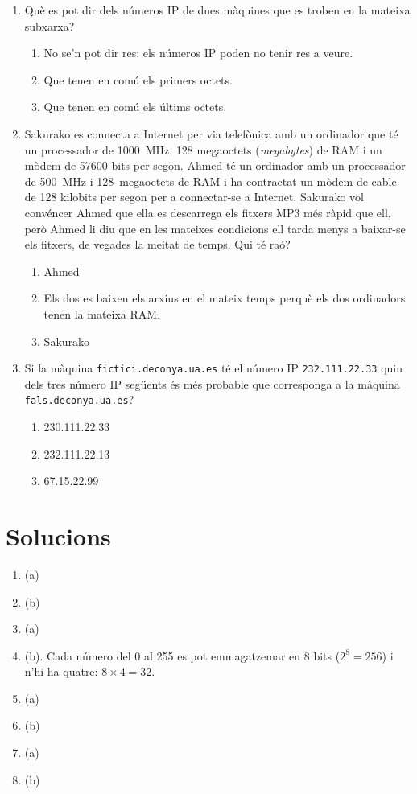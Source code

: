 \begin{enumerate}
\item 
   Què es pot dir dels números IP de dues màquines que es 
   troben en la mateixa subxarxa?
   
\begin{enumerate}
\item No se'n pot dir res: els números IP poden no tenir res a veure.
\item Que tenen en comú els primers octets.
\item Que tenen en comú els últims octets.
\end{enumerate}

\item Sakurako es connecta a Internet per via telefònica amb un
   ordinador que té un processador de 1000~MHz, 128 megaoctets
   (\emph{megabytes}) de RAM i un mòdem de 57600 bits per segon.
   Ahmed té un ordinador amb un processador de 500~MHz i 128~megaoctets
   de RAM i ha contractat un mòdem de cable de 128 kilobits per segon
   per a connectar-se a Internet. Sakurako vol convéncer Ahmed que ella
   es descarrega els fitxers MP3 més ràpid que ell, però Ahmed li diu
   que en les mateixes condicions ell tarda menys a baixar-se els
   fitxers, de vegades la meitat de temps.  Qui té raó?
   
\begin{enumerate}
\item Ahmed
\item Els dos es baixen els arxius en el mateix temps perquè els
      dos ordinadors tenen la mateixa RAM.
\item Sakurako
\end{enumerate}

\item 
   Si la màquina \verb|fictici.deconya.ua.es| té el número IP
   \verb|232.111.22.33| quin dels tres número IP següents és més
   probable que corresponga a la màquina \verb|fals.deconya.ua.es|?
   
\begin{enumerate}
\item 230.111.22.33
\item 232.111.22.13
\item 67.15.22.99
\end{enumerate}


\end{enumerate}

\section{Solucions}
\begin{enumerate}
\item (a)
\item (b)
\item (a)
\item (b). Cada número del 0 al 255 es pot emmagatzemar en 8 bits
  ($2^8=256$) i n'hi ha quatre: $8\times 4=32$.
\item (a)
\item (b)
\item (a)
\item (b)


\end{enumerate}
